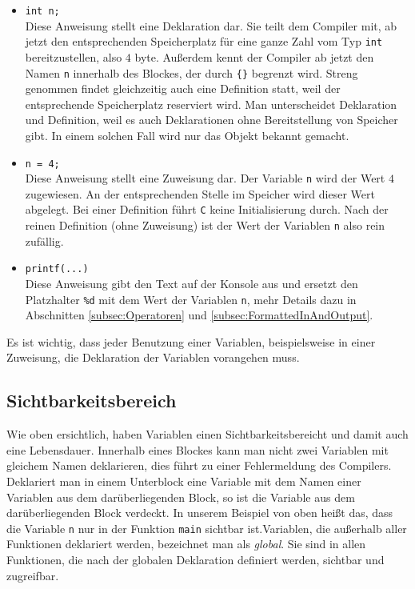 \begin{itemize}
\item \texttt{int n;}\\
  Diese Anweisung stellt eine Deklaration dar.
  Sie teilt dem Compiler mit, ab jetzt den ent\-sprechenden Speicherplatz für eine ganze Zahl vom Typ \texttt{int} bereitzustellen, also $4$ byte.
  Außerdem kennt der Compiler ab jetzt den Namen \texttt{n} innerhalb des Blockes, der durch \texttt{\{\}} begrenzt wird.
  Streng genommen findet gleichzeitig auch eine Definition statt, weil der ent\-sprechende Speicherplatz reserviert wird. 
  Man unterscheidet Deklaration und Definition, weil es auch Deklarationen ohne Bereitstellung von Speicher gibt.
  In einem solchen Fall wird nur das Objekt bekannt gemacht.

\item \verb|n = 4;|\\
  Diese Anweisung stellt eine Zuweisung dar.
  Der Variable \texttt{n} wird der Wert $4$ zugewiesen.
  An der entsprechenden Stelle im Speicher wird dieser Wert abgelegt.
  Bei einer Definition führt \texttt{C} keine Initialisierung durch.
  Nach der reinen Definition (ohne Zuweisung) ist der Wert der Variablen \texttt{n} also rein zufällig.
\item \verb|printf(...)|\\
  Diese Anweisung gibt den Text auf der Konsole aus und ersetzt den Platzhalter \verb|%d| mit dem Wert der Variablen \verb|n|, mehr Details dazu in Abschnitten \ref{subsec:Operatoren} und \ref{subsec:FormattedInAndOutput}.
\end{itemize}
Es ist wichtig, dass jeder Benutzung einer Variablen, beispielsweise in einer Zuweisung, die Deklaration der Variablen vorangehen muss.

\subsection{Sichtbarkeitsbereich}

Wie oben ersichtlich, haben Variablen einen Sichtbarkeitsbereicht und damit auch eine Lebensdauer.
Innerhalb eines Blockes kann man nicht zwei Variablen mit gleichem Namen deklarieren, dies führt zu einer Fehlermeldung des Compilers.
Deklariert man in einem Unterblock eine Variable mit dem Namen einer Variablen aus dem darüberliegenden Block, so ist die Variable aus dem darüberliegenden Block verdeckt.
In unserem Beispiel von oben heißt das, dass die Variable \texttt{n} nur in der Funktion \texttt{main} sichtbar ist.Variablen, die außerhalb aller Funktionen deklariert werden, bezeichnet man als \emph{global}.
Sie sind in allen Funktionen, die nach der globalen Deklaration definiert werden, sichtbar und zugreifbar.


